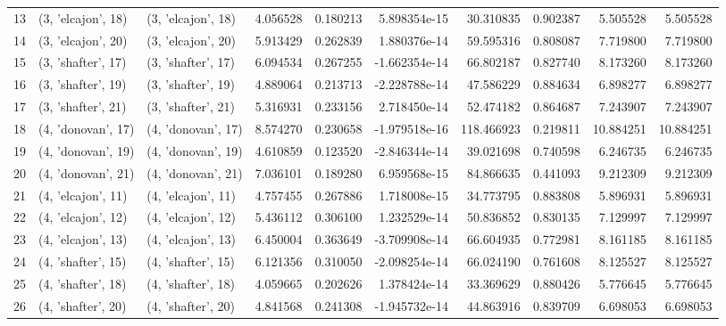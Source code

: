 \begin{tabular}{lllrrrrrrr}
13 &  (3, 'elcajon', 18) &  (3, 'elcajon', 18) &  4.056528 &  0.180213 &  5.898354e-15 &   30.310835 &  0.902387 &   5.505528 &   5.505528 \\
14 &  (3, 'elcajon', 20) &  (3, 'elcajon', 20) &  5.913429 &  0.262839 &  1.880376e-14 &   59.595316 &  0.808087 &   7.719800 &   7.719800 \\
15 &  (3, 'shafter', 17) &  (3, 'shafter', 17) &  6.094534 &  0.267255 & -1.662354e-14 &   66.802187 &  0.827740 &   8.173260 &   8.173260 \\
16 &  (3, 'shafter', 19) &  (3, 'shafter', 19) &  4.889064 &  0.213713 & -2.228788e-14 &   47.586229 &  0.884634 &   6.898277 &   6.898277 \\
17 &  (3, 'shafter', 21) &  (3, 'shafter', 21) &  5.316931 &  0.233156 &  2.718450e-14 &   52.474182 &  0.864687 &   7.243907 &   7.243907 \\
18 &  (4, 'donovan', 17) &  (4, 'donovan', 17) &  8.574270 &  0.230658 & -1.979518e-16 &  118.466923 &  0.219811 &  10.884251 &  10.884251 \\
19 &  (4, 'donovan', 19) &  (4, 'donovan', 19) &  4.610859 &  0.123520 & -2.846344e-14 &   39.021698 &  0.740598 &   6.246735 &   6.246735 \\
20 &  (4, 'donovan', 21) &  (4, 'donovan', 21) &  7.036101 &  0.189280 &  6.959568e-15 &   84.866635 &  0.441093 &   9.212309 &   9.212309 \\
21 &  (4, 'elcajon', 11) &  (4, 'elcajon', 11) &  4.757455 &  0.267886 &  1.718008e-15 &   34.773795 &  0.883808 &   5.896931 &   5.896931 \\
22 &  (4, 'elcajon', 12) &  (4, 'elcajon', 12) &  5.436112 &  0.306100 &  1.232529e-14 &   50.836852 &  0.830135 &   7.129997 &   7.129997 \\
23 &  (4, 'elcajon', 13) &  (4, 'elcajon', 13) &  6.450004 &  0.363649 & -3.709908e-14 &   66.604935 &  0.772981 &   8.161185 &   8.161185 \\
24 &  (4, 'shafter', 15) &  (4, 'shafter', 15) &  6.121356 &  0.310050 & -2.098254e-14 &   66.024190 &  0.761608 &   8.125527 &   8.125527 \\
25 &  (4, 'shafter', 18) &  (4, 'shafter', 18) &  4.059665 &  0.202626 &  1.378424e-14 &   33.369629 &  0.880426 &   5.776645 &   5.776645 \\
26 &  (4, 'shafter', 20) &  (4, 'shafter', 20) &  4.841568 &  0.241308 & -1.945732e-14 &   44.863916 &  0.839709 &   6.698053 &   6.698053 \\
\bottomrule
\end{tabular}
